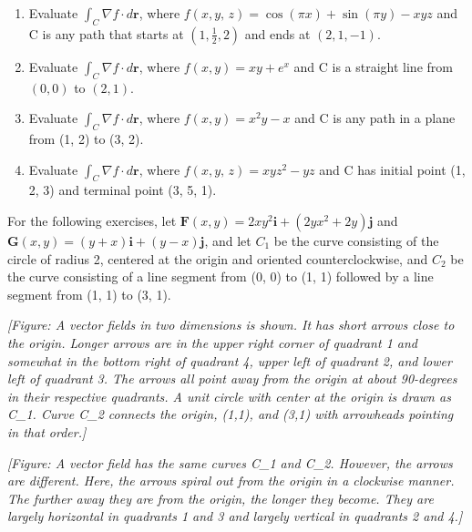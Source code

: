 \documentclass{exercises}
\begin{document}
\begin{enumerate}[resume]
\item Evaluate $\int_{C}\nabla f\cdot d\mathbf{r}$, where $f(x,y,\,z)=\cos(\pi x)+\sin(\pi y)-xyz$ and C is any path that starts at $(1,\frac{1}{2},2)$ and ends at $(2,1,-1)$.
\item \techrequired Evaluate $\int_{C}\nabla f\cdot d\mathbf{r}$, where $f(x,y)=xy+e^{x}$ and C is a straight line from $(0,0)$ to $(2,1)$.
\item \techrequired Evaluate $\int_{C}\nabla f\cdot d\mathbf{r}$, where $f(x,y)=x^{2}y-x$ and C is any path in a plane from (1, 2) to (3, 2).
\item Evaluate $\int_{C}\nabla f\cdot d\mathbf{r}$, where $f(x,y,\,z)=xyz^{2}-yz$ and C has initial point (1, 2, 3) and terminal point (3, 5, 1).
\end{enumerate}

For the following exercises, let $\mathbf{F}(x,y)=2xy^{2}\mathbf{i}+(2yx^{2}+2y)\mathbf{j}$ and $\mathbf{G}(x,y)=(y+x)\mathbf{i}+(y-x)\mathbf{j}$, and let $C_{1}$ be the curve consisting of the circle of radius 2, centered at the origin and oriented counterclockwise, and $C_{2}$ be the curve consisting of a line segment from (0, 0) to (1, 1) followed by a line segment from (1, 1) to (3, 1).


\textit{[Figure: A vector fields in two dimensions is shown. It has short arrows close to the origin. Longer arrows are in the upper right corner of quadrant 1 and somewhat in the bottom right of quadrant 4, upper left of quadrant 2, and lower left of quadrant 3. The arrows all point away from the origin at about 90-degrees in their respective quadrants. A unit circle with center at the origin is drawn as C\_1. Curve C\_2 connects the origin, (1,1), and (3,1) with arrowheads pointing in that order.]}


\textit{[Figure: A vector field has the same curves C\_1 and C\_2. However, the arrows are different. Here, the arrows spiral out from the origin in a clockwise manner. The further away they are from the origin, the longer they become. They are largely horizontal in quadrants 1 and 3 and largely vertical in quadrants 2 and 4.]}
\end{document}
